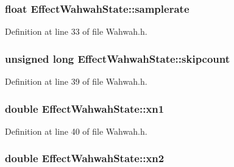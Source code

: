 \subsubsection[{\texorpdfstring{samplerate}{samplerate}}]{\setlength{\rightskip}{0pt plus 5cm}float Effect\+Wahwah\+State\+::samplerate}\hypertarget{class_effect_wahwah_state_a415edbbbddab085862aa62f439c115dc}{}\label{class_effect_wahwah_state_a415edbbbddab085862aa62f439c115dc}


Definition at line 33 of file Wahwah.\+h.

\subsubsection[{\texorpdfstring{skipcount}{skipcount}}]{\setlength{\rightskip}{0pt plus 5cm}unsigned long Effect\+Wahwah\+State\+::skipcount}\hypertarget{class_effect_wahwah_state_a516ca82df0ae182449dadfcebfe47a24}{}\label{class_effect_wahwah_state_a516ca82df0ae182449dadfcebfe47a24}


Definition at line 39 of file Wahwah.\+h.

\subsubsection[{\texorpdfstring{xn1}{xn1}}]{\setlength{\rightskip}{0pt plus 5cm}double Effect\+Wahwah\+State\+::xn1}\hypertarget{class_effect_wahwah_state_a7422c0cf0ba0b15b36635f9b84aaf13a}{}\label{class_effect_wahwah_state_a7422c0cf0ba0b15b36635f9b84aaf13a}


Definition at line 40 of file Wahwah.\+h.

\subsubsection[{\texorpdfstring{xn2}{xn2}}]{\setlength{\rightskip}{0pt plus 5cm}double Effect\+Wahwah\+State\+::xn2}\hypertarget{class_effect_wahwah_state_a1352e9e3234be9589439d20a8ee3b639}{}\label{class_effect_wahwah_state_a1352e9e3234be9589439d20a8ee3b639}


